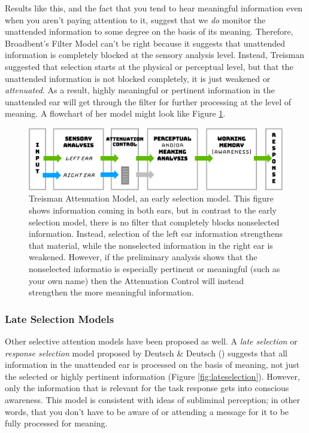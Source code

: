 \documentclass[
]{krantz}
\begin{document}
Results like this, and the fact that you tend to hear meaningful information even when you aren't paying attention to it, suggest that we \emph{do} monitor the unattended information to some degree on the basis of its meaning. Therefore, Broadbent's Filter Model can't be right because it suggests that unattended information is completely blocked at the sensory analysis level. Instead, Treisman suggested that selection starts at the physical or perceptual level, but that the unattended information is not blocked completely, it is just weakened or \emph{attenuated}. As a result, highly meaningful or pertinent information in the unattended ear will get through the filter for further processing at the level of meaning. A flowchart of her model might look like Figure \ref{fig:treisman}.

\begin{figure}

{\centering \includegraphics[width=0.8\linewidth]{images/3_attention/treisman} 

}

\caption{Treisman Attenuation Model, an early selection model. This figure shows information coming in both ears, but in contrast to the early selection model, there is no filter that completely blocks nonselected information. Instead, selection of the left ear information strengthens that material, while the nonselected information in the right ear is weakened. However, if the preliminary analysis shows that the nonselected informatio is especially pertinent or meaningful (such as your own name) then the Attenuation Control will instead strengthen the more meaningful information.}\label{fig:treisman}
\end{figure}

\subsubsection*{Late Selection Models}\label{late-selection-models}


Other selective attention models have been proposed as well. A \emph{late selection} or \emph{response selection} model proposed by Deutsch \& Deutsch () suggests that all information in the unattended ear is processed on the basis of meaning, not just the selected or highly pertinent information (Figure \ref{fig:lateselection}). However, only the information that is relevant for the task response gets into conscious awareness. This model is consistent with ideas of subliminal perception; in other words, that you don't have to be aware of or attending a message for it to be fully processed for meaning.
\end{document}
